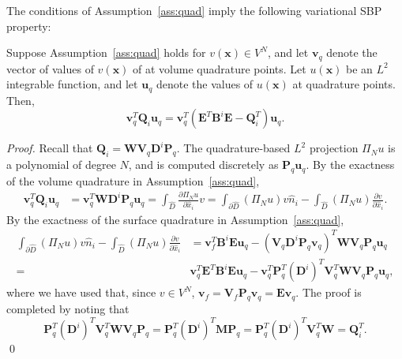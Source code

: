 \documentclass{svjour3}                     %
\renewcommand{\hat}{\widehat}
\newcommand{\pd}[2]{\frac{\partial#1}{\partial#2}}
\newcommand{\LRp}[1]{\left( #1 \right)}
\begin{document}

The conditions of Assumption~\ref{ass:quad} imply the following variational SBP property:
\begin{lemma}
\label{lemma:vsbp}
Suppose Assumption~\ref{ass:quad} holds for $v(\bm{x})\in V^N$, and let $\bm{v}_q$ denote the vector of values of $v(\bm{x})$ of at volume quadrature points. Let $u(\bm{x})$ be an $L^2$ integrable function, and let $\bm{u}_q$ denote the values of $u(\bm{x})$ at quadrature points.  Then, 
\[
\bm{v}_q^T\bm{Q}_i \bm{u}_q = \bm{v}_q^T\LRp{ {\bm{E}}^T \bm{B}^i\bm{E} - \bm{Q}_i^T}\bm{u}_q.
\]
\end{lemma}
\begin{proof}
Recall that $\bm{Q}_i = \bm{W} \bm{V}_q \bm{D}^i\bm{P}_q$.  The quadrature-based $L^2$ projection $\Pi_Nu$ is a polynomial of degree $N$, and is computed discretely as $\bm{P}_q\bm{u}_q$.  By the exactness of the volume quadrature in Assumption~\ref{ass:quad}, 
\begin{align*}
\bm{v}_q^T\bm{Q}_i \bm{u}_q &= \bm{v}_q^T\bm{W} \bm{D}^i \bm{P}_q \bm{u}_q = \int_{\hat{D}} \pd{\Pi_N u}{\hat{x}_i} v = \int_{\partial \hat{D}} (\Pi_N u) v \hat{n}_i - \int_{\hat{D}} \LRp{\Pi_N u} \pd{v}{\hat{x}_i}.
\end{align*}
By the exactness of the surface quadrature in Assumption~\ref{ass:quad}, 
\begin{align*}
\int_{\partial \hat{D}} (\Pi_N u) v \hat{n}_i -   \int_{\hat{D}} \LRp{\Pi_N u} \pd{v}{\hat{x}_i} &=\bm{v}_f^T\bm{B}^i \bm{E}\bm{u}_q - \LRp{\bm{V}_q\bm{D}^i\bm{P}_q\bm{v}_q}^T\bm{W} \bm{V}_q\bm{P}_q\bm{u}_q\\
=& \bm{v}_q^T {\bm{E}}^T\bm{B}^i \bm{E}\bm{u}_q - \bm{v}_q^T \bm{P}_q^T\LRp{\bm{D}^i}^T \bm{V}_q^T \bm{W} \bm{V}_q\bm{P}_q\bm{u}_q,
\end{align*}
where we have used that, since $v \in V^N$, $\bm{v}_f = \bm{V}_f\bm{P}_q\bm{v}_q = \bm{E}\bm{v}_q$.  The proof is completed by noting that 
\[
\bm{P}_q^T\LRp{\bm{D}^i}^T \bm{V}_q^T \bm{W} \bm{V}_q\bm{P}_q = \bm{P}_q^T\LRp{\bm{D}^i}^T \bm{M}\bm{P}_q = \bm{P}_q^T\LRp{\bm{D}^i}^T \bm{V}_q^T\bm{W} = \bm{Q}_i^T.
\]
\qed\end{proof}
\end{document}
